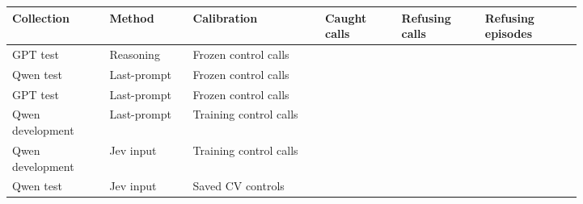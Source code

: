 \begin{tabular}{@{}>{\raggedright\arraybackslash}p{0.14\linewidth}>{\raggedright\arraybackslash}p{0.12\linewidth}>{\raggedright\arraybackslash}p{0.19\linewidth}>{\raggedright\arraybackslash}p{0.11\linewidth}>{\raggedright\arraybackslash}p{0.12\linewidth}>{\raggedright\arraybackslash}p{0.14\linewidth}@{}}
\toprule
Collection & Method & Calibration & Caught calls & Refusing calls & Refusing episodes \\
\midrule
GPT test & Reasoning & Frozen control calls & \gptFreshAlarmZero{} & \gptFreshAlarmOne{} & \gptFreshAlarmTwo{} \\
Qwen test & Last-prompt & Frozen control calls & \qwenFreshAlarmZero{} & \qwenFreshAlarmOne{} & \qwenFreshAlarmTwo{} \\
GPT test & Last-prompt & Frozen control calls & \gptossFreshAlarmZero{} & \gptossFreshAlarmOne{} & \gptossFreshAlarmTwo{} \\
Qwen development & Last-prompt & Training control calls & \qwenDevAlarmProbeZero{} & \qwenDevAlarmProbeOne{} & \qwenDevAlarmProbeTwo{} \\
Qwen development & Jev input & Training control calls & \qwenDevAlarmJevZero{} & \qwenDevAlarmJevOne{} & \qwenDevAlarmJevTwo{} \\
Qwen test & Jev input & Saved CV controls & \qwenFreshJevAuditCaught{} & \qwenFreshJevAuditRefusing{} & \qwenFreshJevAuditEpisodes{} \\
\bottomrule
\end{tabular}
